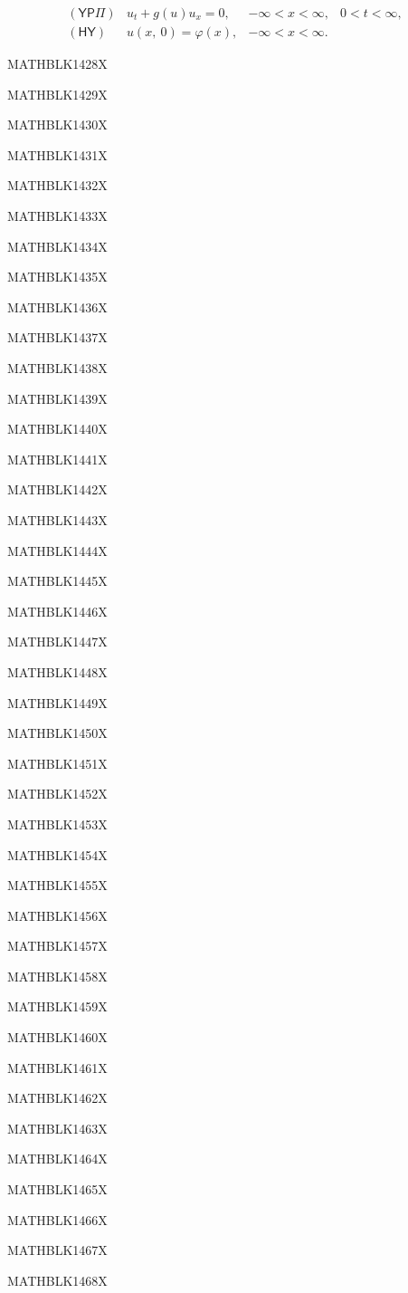 \documentclass[
  ukrainian,
]{article}
\begin{document}
\[
\begin{array}{lll} (\mathsf{Y}\mathsf{P}\Pi) & u_t + g\left(u\right)u_x = 0, & -\infty < x < \infty, & 0 < t < \infty, \\ (\mathsf{H}\mathsf{Y}) & u\left(x, \ 0\right) = \varphi\left(x\right), & -\infty < x < \infty. \end{array}
\]

MATHBLK1428X

MATHBLK1429X

MATHBLK1430X

MATHBLK1431X

MATHBLK1432X

MATHBLK1433X

MATHBLK1434X

MATHBLK1435X

MATHBLK1436X

MATHBLK1437X

MATHBLK1438X

MATHBLK1439X

MATHBLK1440X

MATHBLK1441X

MATHBLK1442X

MATHBLK1443X

MATHBLK1444X

MATHBLK1445X

MATHBLK1446X

MATHBLK1447X

MATHBLK1448X

MATHBLK1449X

MATHBLK1450X

MATHBLK1451X

MATHBLK1452X

MATHBLK1453X

MATHBLK1454X

MATHBLK1455X

MATHBLK1456X

MATHBLK1457X

MATHBLK1458X

MATHBLK1459X

MATHBLK1460X

MATHBLK1461X

MATHBLK1462X

MATHBLK1463X

MATHBLK1464X

MATHBLK1465X

MATHBLK1466X

MATHBLK1467X

MATHBLK1468X
\end{document}
